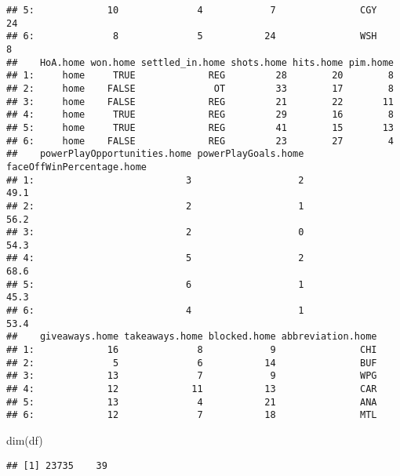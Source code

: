 \documentclass[
]{article}
\newenvironment{Shaded}{\begin{snugshade}}{\end{snugshade}}
\newcommand{\DecValTok}[1]{\textcolor[rgb]{0.00,0.00,0.81}{#1}}
\newcommand{\FunctionTok}[1]{\textcolor[rgb]{0.00,0.00,0.00}{#1}}
\newcommand{\NormalTok}[1]{#1}
\newcommand{\SpecialCharTok}[1]{\textcolor[rgb]{0.00,0.00,0.00}{#1}}
\begin{document}
\begin{verbatim}
## 5:             10              4            7               CGY           24
## 6:              8              5           24               WSH            8
##    HoA.home won.home settled_in.home shots.home hits.home pim.home
## 1:     home     TRUE             REG         28        20        8
## 2:     home    FALSE              OT         33        17        8
## 3:     home    FALSE             REG         21        22       11
## 4:     home     TRUE             REG         29        16        8
## 5:     home     TRUE             REG         41        15       13
## 6:     home    FALSE             REG         23        27        4
##    powerPlayOpportunities.home powerPlayGoals.home faceOffWinPercentage.home
## 1:                           3                   2                      49.1
## 2:                           2                   1                      56.2
## 3:                           2                   0                      54.3
## 4:                           5                   2                      68.6
## 5:                           6                   1                      45.3
## 6:                           4                   1                      53.4
##    giveaways.home takeaways.home blocked.home abbreviation.home
## 1:             16              8            9               CHI
## 2:              5              6           14               BUF
## 3:             13              7            9               WPG
## 4:             12             11           13               CAR
## 5:             13              4           21               ANA
## 6:             12              7           18               MTL
\end{verbatim}

\begin{Shaded}
\begin{Highlighting}[]
\FunctionTok{dim}\NormalTok{(df)}
\end{Highlighting}
\end{Shaded}

\begin{verbatim}
## [1] 23735    39
\end{verbatim}

\begin{Shaded}
\end{Shaded}
\end{document}
